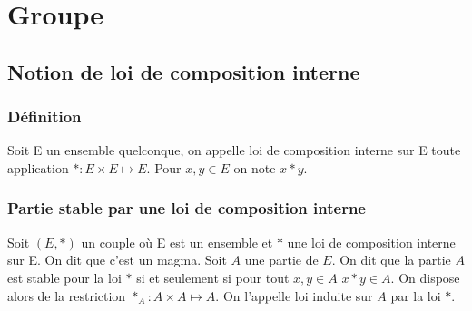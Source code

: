 \label{chap:groupes}
\minitoc
\minilof
\minilot
\section{Groupe}
\subsection{Notion de loi de composition interne}
\subsubsection{Définition}
\begin{defdef}
  Soit E un ensemble quelconque, on appelle loi de composition interne sur E toute application \(*:E\times E \longmapsto E\). Pour \(x,y \in E\) on note \(x*y\).
\end{defdef}
\subsubsection{Partie stable par une loi de composition interne}
\begin{defdef}
  Soit \((E,*)\) un couple où E est un ensemble et \(*\) une loi de composition interne sur E. On dit que c'est un magma. Soit \(A\) une partie de \(E\). On dit que la partie \(A\) est stable pour la loi \(*\) si et seulement si pour tout \(x,y \in A\) \(x*y \in A\). On dispose alors de la restriction \(*_{A} : A\times A \longmapsto A\). On l'appelle loi induite sur \(A\) par la loi \(*\).
\end{defdef}
